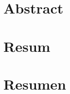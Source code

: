 \chapter*{Abstract}


\newpage{\cleardoublepage}

\chapter*{Resum}



\newpage{\cleardoublepage}

\chapter*{Resumen}


